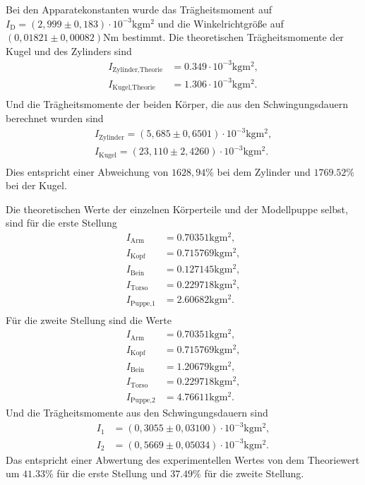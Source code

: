 Bei den Apparatekonstanten wurde das Trägheitsmoment auf \newline
$I_{\text{D}} = (2,999 \pm 0,183) \cdot 10^{-3} \si{\kilogram\meter^2}$ und die
Winkelrichtgröße auf $(0,01821\pm 0,00082) \si{\newton\meter}$ bestimmt.
Die theoretischen Trägheitsmomente der Kugel und des Zylinders sind
\begin{align*}
    I_{\text{Zylinder,Theorie}} &= 0.349 \cdot 10^{-3} \si{\kilogram\meter^2}, \\
    I_{\text{Kugel,Theorie}} &= 1.306 \cdot 10^{-3} \si{\kilogram\meter^2}. \\
\end{align*}
Und die Trägheitsmomente der beiden Körper, die aus den Schwingungsdauern berechnet wurden sind
\begin{align*}
    I_{\text{Zylinder}} = (5,685 \pm 0,6501) \cdot 10^{-3} \si{\kilogram\meter^2}, \\
    I_{\text{Kugel}} = (23,110 \pm 2,4260) \cdot 10^{-3} \si{\kilogram\meter^2}. \\
\end{align*}
Dies entspricht einer Abweichung von $1628,94\%$ bei dem Zylinder und $1769.52\%$ bei der Kugel.

Die theoretischen Werte der einzelnen Körperteile und der Modellpuppe selbst, sind für die erste Stellung
\begin{align*}
    I_{\text{Arm}} &= 0.70351 \si{\kilogram\meter^2}, \\
    I_{\text{Kopf}} &= 0.715769 \si{\kilogram\meter^2}, \\
    I_{\text{Bein}} &= 0.127145 \si{\kilogram\meter^2}, \\
    I_{\text{Torso}} &= 0.229718 \si{\kilogram\meter^2}, \\
    I_{\text{Puppe,1}} &= 2.60682 \si{\kilogram\meter^2}. \\
\end{align*}
Für die zweite Stellung sind die Werte
\begin{align*}
    I_{\text{Arm}} &= 0.70351 \si{\kilogram\meter^2}, \\
    I_{\text{Kopf}} &= 0.715769 \si{\kilogram\meter^2}, \\
    I_{\text{Bein}} &= 1.20679 \si{\kilogram\meter^2}, \\ 
    I_{\text{Torso}} &= 0.229718 \si{\kilogram\meter^2}, \\
    I_{\text{Puppe,2}} &= 4.76611 \si{\kilogram\meter^2}.
\end{align*}
Und die Trägheitsmomente aus den Schwingungsdauern sind
\begin{align*}
    I_{1} &= (0,3055\pm 0,03100) \cdot 10^{-3} \si{\kilogram\meter^2}, \\
    I_{2} &= (0,5669\pm 0,05034) \cdot 10^{-3} \si{\kilogram\meter^2}.
\end{align*}
Das entspricht einer Abwertung des experimentellen Wertes von dem Theoriewert um $41.33 \%$ für die erste Stellung und
$37.49 \%$ für die zweite Stellung.


